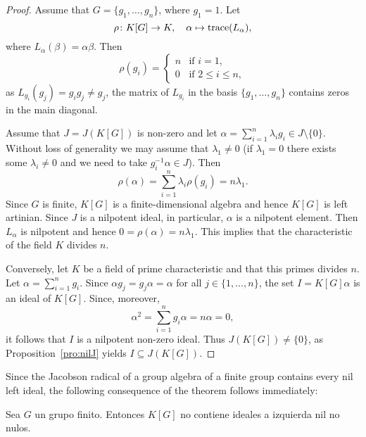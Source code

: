 \begin{proof}
	Assume that $G=\{g_1,\dots,g_n\}$, where $g_1=1$. Let 
	\[
	\rho\colon K[G]\to K,
	\quad
	\alpha\mapsto\operatorname{trace}(L_{\alpha}),
	\]
	where 
	$L_{\alpha}(\beta)=\alpha\beta$. Then 
	\[
	\rho(g_i)=\begin{cases}
	    n & \text{if $i=1$,}\\
	    0 & \text{if $2\leq i\leq n$},
	\end{cases}
	\]
	as $L_{g_i}(g_j)=g_{i}g_j\ne g_j$, the matrix of 
	$L_{g_i}$ in the basis $\{g_1,\dots,g_n\}$ contains zeros in the main diagonal. 

	Assume that $J=J(K[G])$ is non-zero and let 
	$\alpha=\sum_{i=1}^n\lambda_ig_i\in J\setminus\{0\}$. Without loss of generality
	we may assume that $\lambda_1\ne 0$ (if $\lambda_1=0$ there exists some 
	$\lambda_i\ne 0$ and we need to take $g_i^{-1}\alpha\in J$). Then 
	\[
		\rho(\alpha)=\sum_{i=1}^n \lambda_i\rho(g_i)=n\lambda_1.
	\]
	Since $G$ is finite, $K[G]$ is a finite-dimensional algebra and hence 
	$K[G]$ is left artinian. Since $J$ is a nilpotent ideal, 
	in particular, $\alpha$ is a nilpotent element. Then 
	$L_{\alpha}$ is nilpotent and hence $0=\rho(\alpha)=n\lambda_1$. This implies that
	the characteristic of the field $K$ divides $n$. 

	Conversely, let $K$ be a field of prime characteristic and that this primes divides 
	$n$. Let $\alpha=\sum_{i=1}^ng_i$. Since $\alpha
	g_j=g_j\alpha=\alpha$ for all $j\in\{1,\dots,n\}$, the set 
	$I=K[G]\alpha$ is an ideal of $K[G]$. Since, moreover,   
	\[
		\alpha^2=\sum_{i=1}^n g_i\alpha=n\alpha=0,
	\]
	it follows that $I$ is a nilpotent non-zero ideal. Thus $J(K[G])\ne\{0\}$, 
	as Proposition~\ref{pro:nilJ} yields $I\subseteq J(K[G])$.
\end{proof}

Since the Jacobson radical of a group algebra of a finite group contains 
every nil left ideal, the following consequence of the theorem follows immediately:

\begin{corollary}
	\label{cor:GfinitoNOnil}
	Sea $G$ un grupo finito. Entonces $K[G]$ no contiene ideales a izquierda
	nil no nulos.
\end{corollary}



